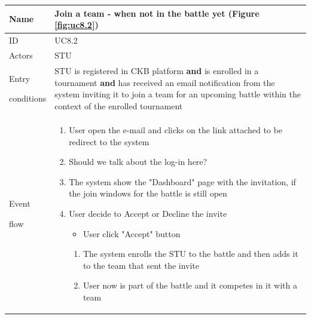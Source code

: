 \begin{center}
    \def\arraystretch{1.5}
    \begin{tabular}{| m{2cm} | m{10cm}|}
        \hline
        Name                  & Join a team - when not in the battle yet (Figure \ref{fig:uc8.2}) \\ \hline
        ID                    & UC8.2                                   \\ \hline
        Actors                & STU                                   \\ \hline
        Entry \par conditions & STU is registered in CKB platform 
                                    \textbf{and} is enrolled in a tournament 
                                    \textbf{and} has received an email notification from the system inviting it to join a team for an upcoming battle within the context of the enrolled tournament \\ \hline
        Event \par flow       & \begin{enumerate}
                                    \item User open the e-mail and clicks on the link attached to be redirect to the system
                                    \item {\color{red} Should we talk about the log-in here?}
                                    \item The system show the "Dashboard" page with the invitation, if the join windows for the battle is still open
                                    \item User decide to Accept or Decline the invite 
                                        \begin{itemize}
                                            \item User click "Accept" button
                                        \end{itemize} 
                                            \begin{enumerate}
                                                \item The system enrolls the STU to the battle and then adds it to the team that sent the invite
                                                \item User now is part of the battle and it competes in it with a team
                                            \end{enumerate}

\end{enumerate}
\end{tabular}
\end{center}
